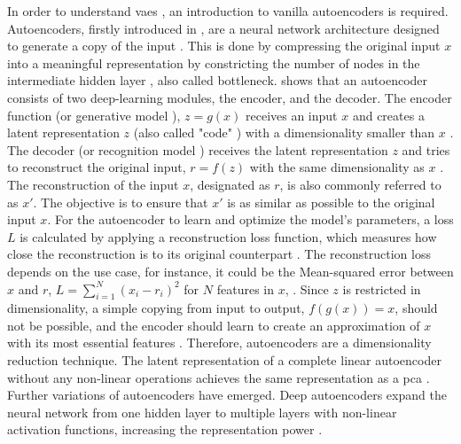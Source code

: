In order to understand \glspl{vae} \cite{kingma2013AutoEncodingVariationalBayes}, an introduction to vanilla autoencoders is required.
Autoencoders, firstly introduced in \cite{rumelhart1986LearningInternalRepresentations}, are a neural network architecture designed to generate a copy of the input \cite{Goodfellow-et-al-2016, Bank2020Autoencoders}.
This is done by compressing the original input $x$ into a meaningful representation by constricting the number of nodes in the intermediate hidden layer \cite{aggarwal2018NeuralNetworksDeep, Bank2020Autoencoders}, also called bottleneck.
 shows that an autoencoder consists of two deep-learning modules, the encoder, and the decoder.
The encoder function (or generative \gls{model} \cite{kingma2019IntroductionVariationalAutoencoders}), $z=g(x)$ receives an input $x$ and creates a latent representation $z$ (also called "code" \cite[p. 72]{aggarwal2018NeuralNetworksDeep}) with a dimensionality smaller than $x$ \cite{Goodfellow-et-al-2016, Bank2020Autoencoders}.
The decoder (or recognition \gls{model} \cite{kingma2019IntroductionVariationalAutoencoders}) receives the latent representation $z$ and tries to reconstruct the original input, $r=f(z)$ with the same dimensionality as $x$ \cite{Goodfellow-et-al-2016}.
The reconstruction of the input $x$, designated as $r$, is also commonly referred to as $x'$. 
The objective is to ensure that $x'$ is as similar as possible to the original input $x$.
For the autoencoder to learn and optimize the \gls{model}'s parameters, a loss $L$ is calculated by applying a reconstruction loss function, which measures how close the reconstruction is to its original counterpart \cite{Bank2020Autoencoders, maheshwari2022AutoencoderIssuesChallenges}.
The reconstruction loss depends on the use case, for instance, it could be the Mean-squared error between $x$ and $r$, $L=\sum_{i=1}^{N}(x_i-r_i)^2$ for $N$ features in $x$, \cite{aggarwal2018NeuralNetworksDeep, Goodfellow-et-al-2016}.
Since $z$ is restricted in dimensionality, a simple copying from input to output, \ie $f(g(x))=x$, should not be possible, and the encoder should learn to create an approximation of $x$ with its most essential features \cite{aggarwal2018NeuralNetworksDeep}.
Therefore, autoencoders are a dimensionality reduction technique.
The latent representation of a complete linear autoencoder without any non-linear operations achieves the same representation as a \gls{pca} \cite{plaut2018PrincipalSubspacesPrincipal, Bank2020Autoencoders}.
Further variations of autoencoders have emerged.
Deep autoencoders expand the neural network from one hidden layer to multiple layers with non-linear activation functions, increasing the representation power \cite{aggarwal2018NeuralNetworksDeep}.
